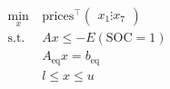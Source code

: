 \documentclass[preview]{standalone}
\begin{document}
\begin{align*}
\begin{aligned}\min_{x} &\ \text{prices}^\top \begin{pmatrix} x_1 \vdots x_7 \end{pmatrix} \\\text{s.t.} &\ Ax \leq -E\left(\text{SOC}=1\right) \\&\ A_\text{eq} x = b_\text{eq} \\&\ l \leq x \leq u \end{aligned}
\end{align*}
\end{document}
